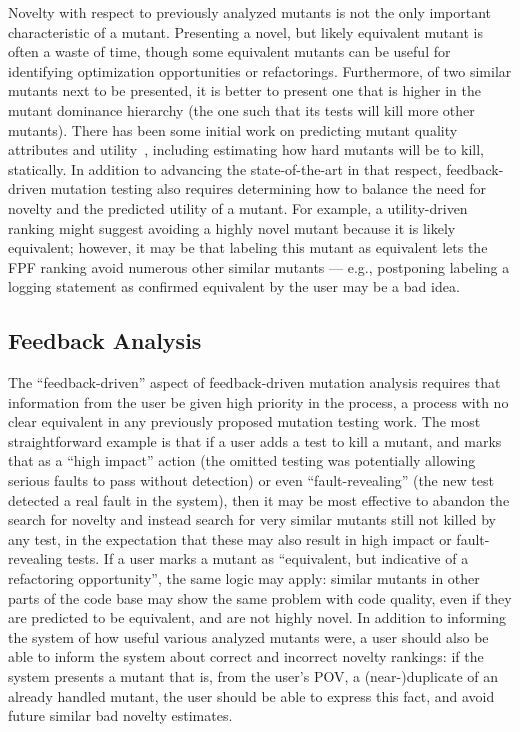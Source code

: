Novelty with respect to previously analyzed mutants is not the only
important characteristic of a mutant.  Presenting a novel, but likely
equivalent mutant is often a waste of time, though some equivalent
mutants can be useful for identifying optimization opportunities or
refactorings.  Furthermore, of two similar mutants next to be presented,
it is better to present one that is higher in the mutant dominance
hierarchy (the one such that its tests will kill more other mutants).
There has been some initial work on predicting mutant quality
attributes and utility~\cite{MutQuality,FaRM}, including estimating how hard mutants
will be to kill, statically.  In addition to advancing the
state-of-the-art in that respect, feedback-driven mutation testing
also requires determining how to balance the need for novelty and the
predicted utility of a mutant.  For example, a utility-driven ranking
might suggest avoiding a highly novel mutant because it is likely
equivalent; however, it may be that labeling this mutant as equivalent
lets the FPF ranking avoid numerous other similar mutants --- e.g.,
postponing labeling a logging statement as confirmed equivalent by the
user may be a bad idea.

\subsection{Feedback Analysis}
\label{sec:feedbackplan}

The ``feedback-driven'' aspect of feedback-driven mutation analysis
requires that information from the user be given high priority in the
process, a process with no clear equivalent in any previously proposed
mutation testing work.  The most straightforward example is that if a
user adds a test to kill a mutant, and marks that as a ``high impact''
action (the omitted testing was potentially allowing serious faults to
pass without detection) or even ``fault-revealing'' (the new test
detected a real fault in the system), then it may be most effective to
abandon the search for novelty and instead search for very similar
mutants still not killed by any test, in the expectation that these
may also result in high impact or fault-revealing tests.  If a user
marks a mutant as ``equivalent, but indicative of a refactoring
opportunity'', the same logic may apply:  similar mutants in other
parts of the code base may show the same problem with code quality,
even if they are predicted to be equivalent, and are not highly
novel.  In addition to informing the system of how useful various
analyzed mutants were, a user should also be able to inform the system
about correct and incorrect novelty rankings:  if the system presents
a mutant that is, from the user's POV, a (near-)duplicate of an
already handled mutant, the user should be able to express this fact,
and avoid future similar bad novelty estimates.

